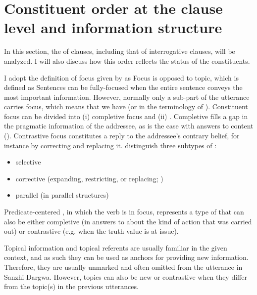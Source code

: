 \section{Constituent order at the clause level and information structure}
\label{sec:Constituent order at the clause level and information structure}

In this section, the  of clauses, including that of interrogative clauses, will be analyzed. I will also discuss how this order reflects the  status of the constituents.

I adopt the definition of focus given by \citet{Diketal1981} as  Focus is opposed to topic, which is defined as  Sentences can be fully-focused when the entire sentence conveys the most important information. However, normally only a sub-part of the utterance carries focus, which means that we have  (or  in the terminology of \citealp{Diketal1981}). Constituent focus can be divided into (i) completive focus and (ii) . Completive  fills a gap in the pragmatic information of the addressee, as is the case with answers to content  (). Contrastive focus constitutes a reply to the addressee's contrary belief, for instance by correcting and replacing it.  distinguish three subtypes of :
%
\begin{itemize}
	\item	selective
	\item	corrective (expanding, restricting, or replacing; )
	\item	parallel (in parallel structures)
\end{itemize}

Predicate-centered , in which the verb is in focus, represents a type of  that can also be either completive (in answers to  about the kind of action that was carried out) or contrastive (e.g. when the truth value is at issue).

Topical information and topical referents are usually familiar in the given context, and as such they can be used as anchors for providing new information. Therefore, they are usually unmarked and often omitted from the utterance in Sanzhi Dargwa. However, topics can also be new or contrastive when they differ from the topic(s) in the previous utterances.

